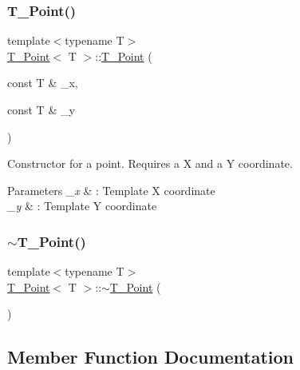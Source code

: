 \subsubsection{\texorpdfstring{T\+\_\+\+Point()}{T\_Point()}\hspace{0.1cm}{\footnotesize\ttfamily [4/4]}}
{\footnotesize\ttfamily template$<$typename T$>$ \\
\hyperlink{classT__Point}{T\+\_\+\+Point}$<$ T $>$\+::\hyperlink{classT__Point}{T\+\_\+\+Point} (\begin{DoxyParamCaption}\item[{const T \&}]{\+\_\+x,  }\item[{const T \&}]{\+\_\+y }\end{DoxyParamCaption})\hspace{0.3cm}{\ttfamily [inline]}}



Constructor for a point. Requires a X and a Y coordinate. 


\begin{DoxyParams}{Parameters}
{\em \+\_\+x} & \+: Template X coordinate \\
\hline
{\em \+\_\+y} & \+: Template Y coordinate \\
\hline
\end{DoxyParams}
\mbox{\label{classT__Point_aeab73ddfa664bfe9ac4ce92982c1c36b}} 
\subsubsection{\texorpdfstring{$\sim$\+T\+\_\+\+Point()}{~T\_Point()}}
{\footnotesize\ttfamily template$<$typename T$>$ \\
\hyperlink{classT__Point}{T\+\_\+\+Point}$<$ T $>$\+::$\sim$\hyperlink{classT__Point}{T\+\_\+\+Point} (\begin{DoxyParamCaption}{ }\end{DoxyParamCaption})\hspace{0.3cm}{\ttfamily [default]}}



\subsection{Member Function Documentation}
\mbox{\label{classT__Point_ab92f1605c6f5008b42105b4c7a7fc1b2}} 
